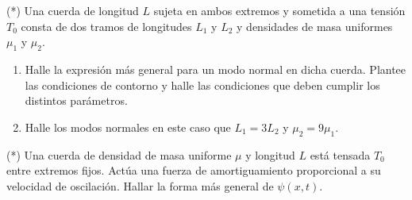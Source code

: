 \item (*) Una cuerda de longitud $L$ sujeta en ambos extremos y sometida a una tensión $T_{0}$ consta de dos tramos de longitudes $L_1$ y $L_2$ y densidades de masa uniformes $\mu_1$ y $\mu_2$.
\begin{enumerate}
	\item Halle la expresión más general para un modo normal en dicha cuerda.
	Plantee las condiciones de contorno y halle las condiciones que deben cumplir los distintos parámetros.
	\item Halle los modos normales en este caso que $L_{1}=3L_{2}$ y $\mu_{2}=9\mu_{1}$. 
\end{enumerate}


\item (*) Una cuerda de densidad de masa uniforme $\mu$ y longitud $L$ está tensada $T_0$ entre extremos fijos.
Actúa una fuerza de amortiguamiento proporcional a su velocidad de oscilación.
Hallar la forma más general de $\psi(x,t)$.


